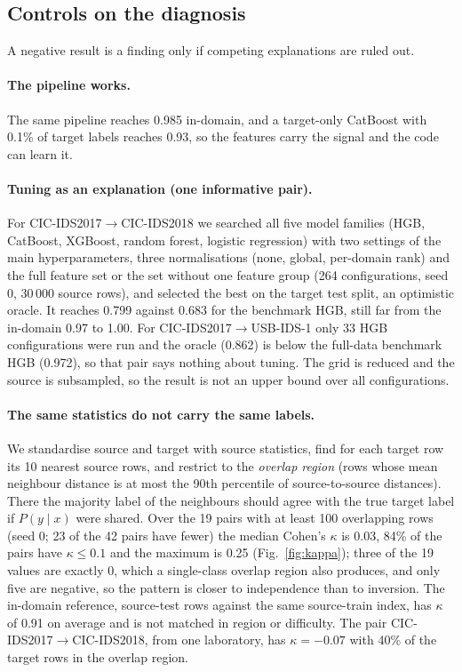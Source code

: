 \documentclass[11pt]{article}
\begin{document}
\subsection{Controls on the diagnosis}\label{sec:diag}
A negative result is a finding only if competing explanations are ruled out.
\paragraph{The pipeline works.}
The same pipeline reaches 0.985 in-domain, and a target-only CatBoost with 0.1\% of target labels reaches 0.93, so the features carry the signal and the code can learn it.

\paragraph{Tuning as an explanation (one informative pair).}
For CIC-IDS2017$\rightarrow$CIC-IDS2018 we searched all five model families (HGB, CatBoost, XGBoost, random forest, logistic regression) with two settings of the main hyperparameters, three normalisations (none, global, per-domain rank) and the full feature set or the set without one feature group (264 configurations, seed 0, 30\,000 source rows), and selected the best on the target test split, an optimistic oracle.
It reaches 0.799 against 0.683 for the benchmark HGB, still far from the in-domain 0.97 to 1.00.
For CIC-IDS2017$\rightarrow$USB-IDS-1 only 33 HGB configurations were run and the oracle (0.862) is below the full-data benchmark HGB (0.972), so that pair says nothing about tuning.
The grid is reduced and the source is subsampled, so the result is not an upper bound over all configurations.

\paragraph{The same statistics do not carry the same labels.}
We standardise source and target with source statistics, find for each target row its 10 nearest source rows, and restrict to the \emph{overlap region} (rows whose mean neighbour distance is at most the 90th percentile of source-to-source distances).
There the majority label of the neighbours should agree with the true target label if $P(y\mid x)$ were shared.
Over the 19 pairs with at least 100 overlapping rows (seed 0; 23 of the 42 pairs have fewer) the median Cohen's $\kappa$ is 0.03, 84\% of the pairs have $\kappa\le0.1$ and the maximum is 0.25 (Fig.~\ref{fig:kappa}); three of the 19 values are exactly 0, which a single-class overlap region also produces, and only five are negative, so the pattern is closer to independence than to inversion. The in-domain reference, source-test rows against the same source-train index, has $\kappa$ of 0.91 on average and is not matched in region or difficulty.
The pair CIC-IDS2017$\rightarrow$CIC-IDS2018, from one laboratory, has $\kappa=-0.07$ with 40\% of the target rows in the overlap region.
\end{document}
